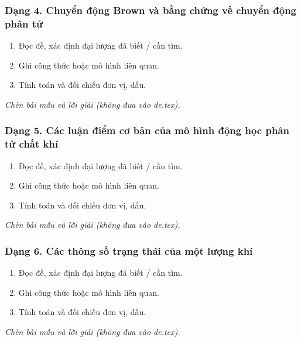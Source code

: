 \subsubsection{Dạng 4. Chuyển động Brown và bằng chứng về chuyển động phân tử}
\begin{phuongphap}
\begin{enumerate}
\item Đọc đề, xác định đại lượng đã biết / cần tìm.
\item Ghi công thức hoặc mô hình liên quan.
\item Tính toán và đối chiếu đơn vị, dấu.
\end{enumerate}
\end{phuongphap}
\begin{vidumau}
\textit{Chèn bài mẫu và lời giải (không đưa vào de.tex).}
\end{vidumau}

\subsubsection{Dạng 5. Các luận điểm cơ bản của mô hình động học phân tử chất khí}
\begin{phuongphap}
\begin{enumerate}
\item Đọc đề, xác định đại lượng đã biết / cần tìm.
\item Ghi công thức hoặc mô hình liên quan.
\item Tính toán và đối chiếu đơn vị, dấu.
\end{enumerate}
\end{phuongphap}
\begin{vidumau}
\textit{Chèn bài mẫu và lời giải (không đưa vào de.tex).}
\end{vidumau}

\subsubsection{Dạng 6. Các thông số trạng thái của một lượng khí}
\begin{phuongphap}
\begin{enumerate}
\item Đọc đề, xác định đại lượng đã biết / cần tìm.
\item Ghi công thức hoặc mô hình liên quan.
\item Tính toán và đối chiếu đơn vị, dấu.
\end{enumerate}
\end{phuongphap}
\begin{vidumau}
\textit{Chèn bài mẫu và lời giải (không đưa vào de.tex).}
\end{vidumau}

